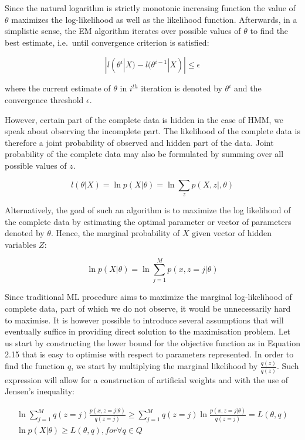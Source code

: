 Since the natural logarithm is strictly monotonic increasing function the value of $\theta$ maximizes the log-likelihood as well as the likelihood function. Afterwards, in a simplistic sense, the EM algorithm iterates over possible values of $\theta$ to find the best estimate, i.e.\ until convergence criterion is satisfied:

\begin{equation}
|l(\theta^i|X) - l(\theta^{i-1}|X)| \leq \epsilon 
\end{equation}

where the current estimate of $\theta$ in $i^{th}$ iteration is denoted by $\theta^i$ and the convergence threshold $\epsilon$. 

However, certain part of the complete data is hidden in the case of HMM, we speak about observing the incomplete part. The likelihood of the complete data is therefore a joint probability of observed and hidden part of the data. Joint probability of the complete data may also be formulated by summing over all possible values of $z$. 

\begin{equation}
l(\theta|X)  = \ln p(X|\theta) = \ln \sum_z p(X,z|,\theta)
\end{equation}

Alternatively, the goal of such an algorithm is to maximize the log likelihood of the complete data by estimating the optimal parameter or vector of parameters denoted by $\theta$. Hence, the marginal probability of $X$ given vector of hidden variables $Z$:

\begin{equation}
\ln p(X|\theta) = \ln \sum_{j=1}^{M} p(x, z = j|\theta)
\end{equation}

Since traditional ML procedure aims to maximize the marginal log-likelihood of complete data, part of which we do not observe, it would be unnecessarily hard to maximise. It is however possible to introduce several assumptions that will eventually suffice in providing direct solution to the maximisation problem.  Let us start by constructing the lower bound for the objective function as in Equation 2.15 that is easy to optimise with respect to parameters represented. In order to find the function $q$, we start by multiplying the marginal likelihood by $\frac{q(z)}{q(z)}$. Such expression will allow for a construction of artificial weights and with the use of Jensen's inequality:

\begin{gather}
\ln \sum_{j=1}^{M} q(z = j) \frac{p(x, z = j|\theta)}{q(z = j)}  \geq \sum_{j=1}^{M} q(z = j) \ln \frac{p(x, z = j|\theta)}{q(z = j)} = L(\theta,q) \\
\ln p(X|\theta) \geq L(\theta,q), for \forall q \in Q
\end{gather}

